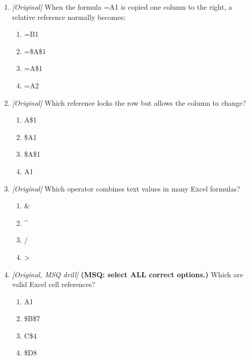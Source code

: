 \begin{enumerate}[label=\textbf{Q\arabic*.}, leftmargin=*]
\item \textit{[Original]} When the formula =A1 is copied one column to the right, a relative reference normally becomes:
  \begin{enumerate}[label=\Alph*.]
\item =B1
   \item =\$A\$1
   \item =A\$1
   \item =A2
  \end{enumerate}

\item \textit{[Original]} Which reference locks the row but allows the column to change?
  \begin{enumerate}[label=\Alph*.]
\item A\$1
   \item \$A1
   \item \$A\$1
   \item A1
  \end{enumerate}

\item \textit{[Original]} Which operator combines text values in many Excel formulas?
  \begin{enumerate}[label=\Alph*.]
\item \&
   \item \^{}
   \item /
   \item >
  \end{enumerate}

\item \textit{[Original, MSQ drill]} \textbf{(MSQ: select ALL correct options.)} Which are valid Excel cell references?
  \begin{enumerate}[label=\Alph*.]
\item A1
   \item \$B\$7
   \item C\$4
   \item \$D8
  \end{enumerate}

\end{enumerate}
